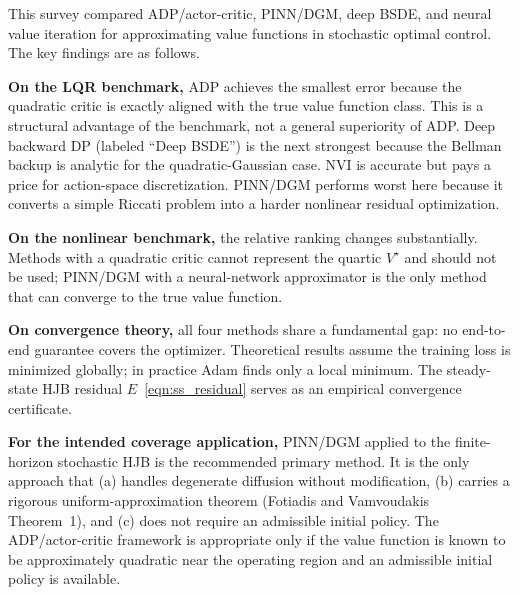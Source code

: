 This survey compared ADP/actor-critic, PINN/DGM, deep BSDE, and neural
value iteration for approximating value functions in stochastic optimal control.
The key findings are as follows.

\textbf{On the LQR benchmark,} ADP achieves the smallest error because the
quadratic critic is exactly aligned with the true value function class.
This is a structural advantage of the benchmark, not a general superiority
of ADP.  Deep backward DP (labeled ``Deep BSDE'') is the next strongest
because the Bellman backup is analytic for the quadratic-Gaussian case.
NVI is accurate but pays a price for action-space discretization.
PINN/DGM performs worst here because it converts a simple Riccati problem
into a harder nonlinear residual optimization.

\textbf{On the nonlinear benchmark,} the relative ranking changes substantially.
Methods with a quadratic critic cannot represent the quartic $V^\star$ and
should not be used; PINN/DGM with a neural-network approximator is the only
method that can converge to the true value function.

\textbf{On convergence theory,} all four methods share a fundamental gap:
no end-to-end guarantee covers the optimizer.  Theoretical results assume
the training loss is minimized globally; in practice Adam finds only a
local minimum.  The steady-state HJB residual $E$~\eqref{eqn:ss_residual}
serves as an empirical convergence certificate.

\textbf{For the intended coverage application,} PINN/DGM applied to the
finite-horizon stochastic HJB is the recommended primary method.
It is the only approach that (a) handles degenerate diffusion without
modification, (b) carries a rigorous uniform-approximation theorem
(Fotiadis and Vamvoudakis~\cite{fotiadis2025pinn} Theorem~1), and
(c) does not require an admissible initial policy.
The ADP/actor-critic framework is appropriate only if the value function
is known to be approximately quadratic near the operating region and
an admissible initial policy is available.
